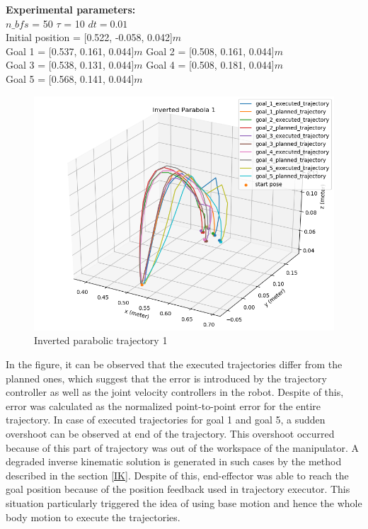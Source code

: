 \textbf{Experimental parameters:} \\
$n\_bfs$ = 50 \hspace{3cm}
$\tau$ = 10 \hspace{3cm}
$dt = 0.01$ \\
Initial position = [0.522, -0.058, 0.042]$m$ \\
Goal 1 = [0.537, 0.161, 0.044]$m$ \hspace{2cm}
Goal 2 = [0.508, 0.161, 0.044]$m$ \\
Goal 3 = [0.538, 0.131, 0.044]$m$ \hspace{2cm}
Goal 4 = [0.508, 0.181, 0.044]$m$ \\
Goal 5 = [0.568, 0.141, 0.044]$m$
\begin{figure}[H]
	\includegraphics[width=\textwidth]{images/1/inv_par_1.png}
	\caption{Inverted parabolic trajectory 1}
	\label{fig:inv_par_1}
\end{figure}

In the figure, it can be observed that the executed trajectories differ from the planned ones, which suggest that the error is introduced by the trajectory controller as well as the joint velocity controllers in the robot. Despite of this, error was calculated as the normalized point-to-point error for the entire trajectory. In case of executed trajectories for goal 1 and goal 5, a sudden overshoot can be observed at end of the trajectory. This overshoot occurred because of this part of trajectory was out of the workspace of the manipulator. A degraded inverse kinematic solution is generated in such cases by the method described in the section \ref{IK}. Despite of this, end-effector was able to reach the goal position because of the position feedback used in trajectory executor. This situation particularly triggered the idea of using base motion and hence the whole body motion to execute the trajectories.  

